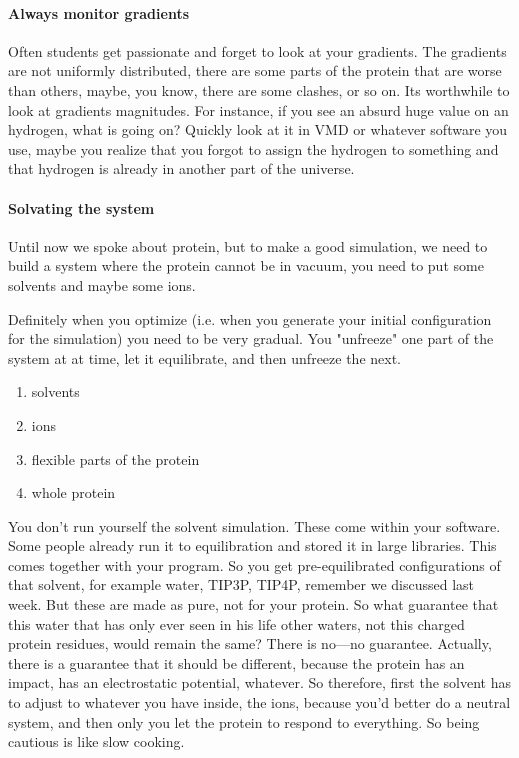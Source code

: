 \paragraph{Always monitor gradients}
Often students get passionate and forget to look at your gradients.
The gradients are not uniformly distributed, there are some parts of the protein that are worse than others, maybe, you know, there are some clashes, or so on.
Its worthwhile to look at gradients magnitudes. For instance, if you see an absurd huge value on an hydrogen, what is going on? Quickly look at it in VMD or whatever software you use, maybe you realize that you forgot to assign the hydrogen to something and that hydrogen is already in another part of the universe. 



\paragraph{Solvating the system}
Until now we spoke about protein, but to make a good simulation, we need to build a system where the protein cannot be in vacuum, you need to put some solvents and maybe some ions.

Definitely when you optimize (i.e. when you generate your initial configuration for the simulation) you need to be very gradual. You "unfreeze" one part of the system at at time, let it equilibrate,
and then unfreeze the next.

\begin{enumerate}
    \item solvents
    \item ions
    \item flexible parts of the protein
    \item whole protein
\end{enumerate}

You don't run yourself the solvent simulation. These come within your software. Some people already run it to equilibration and stored it in large libraries. This comes together with your program. So you get pre-equilibrated configurations of that solvent, for example water, TIP3P, TIP4P, remember we discussed last week.
But these are made as pure, not for your protein. So what guarantee that this water that has only ever seen in his life other waters, not this charged protein residues, would remain the same?
There is no—no guarantee. Actually, there is a guarantee that it should be different, because the protein has an impact, has an electrostatic potential, whatever. So therefore, first the solvent has to adjust to whatever you have inside, the ions, because you'd better do a neutral system, and then only you let the protein to respond to everything.
So being cautious is like slow cooking.

